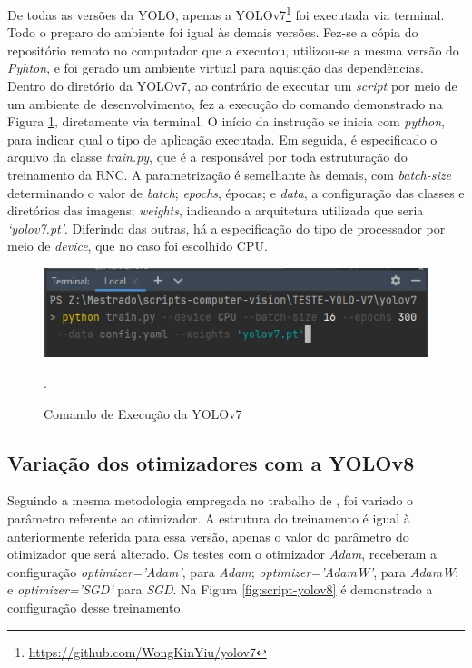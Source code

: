 De todas as versões da YOLO, apenas a YOLOv7\footnote{\url{https://github.com/WongKinYiu/yolov7}} foi executada via terminal. Todo o preparo do ambiente foi igual às demais versões. Fez-se a cópia do repositório remoto no computador que a executou, utilizou-se a mesma versão do \textit{Pyhton}, e foi gerado um ambiente virtual para aquisição das dependências. Dentro do diretório da YOLOv7, ao contrário de executar um \textit{script} por meio de um ambiente de desenvolvimento, fez a execução do comando demonstrado na Figura \ref{fig:script-yolov7}, diretamente via terminal. O início da instrução se inicia com \textit{python}, para indicar qual o tipo de aplicação executada. Em seguida, é especificado o arquivo da classe \textit{train.py}, que é a responsável por toda estruturação do treinamento da RNC.  A parametrização é semelhante às demais, com \textit{batch-size} determinando o valor de \textit{batch}; \textit{epochs}, épocas; e \textit{data}, a configuração das classes e diretórios das imagens; \textit{weights}, indicando a arquitetura utilizada que seria \textit{‘yolov7.pt’}. Diferindo das outras, há a especificação do tipo de processador por meio de \textit{device}, que no caso foi escolhido CPU.

\begin{figure}[!h]
    \centering
    \begin{minipage}{0.7\linewidth}
    \centering
    \captionsetup{justification=centering,margin=0.5cm,font=small}
    \includegraphics[width=1\linewidth]{img/cap5/script-yolov7.jpg}
    \caption{Comando de Execução da YOLOv7}.
    \label{fig:script-yolov7}
    \end{minipage}
\end{figure}

\subsection{Variação dos otimizadores com a YOLOv8}

Seguindo a mesma metodologia empregada no trabalho de \cite{gonzaga2023identificaccao}, foi variado o parâmetro referente ao otimizador. A estrutura do treinamento é igual à anteriormente referida para essa versão, apenas o valor do parâmetro do otimizador que será alterado. Os testes com o otimizador \textit{Adam}, receberam a configuração \textit{optimizer=’Adam’}, para \textit{Adam}; \textit{optimizer=’AdamW’}, para \textit{AdamW}; e \textit{optimizer=’SGD’} para \textit{SGD}. Na Figura \ref{fig:script-yolov8} é demonstrado a configuração desse treinamento.

